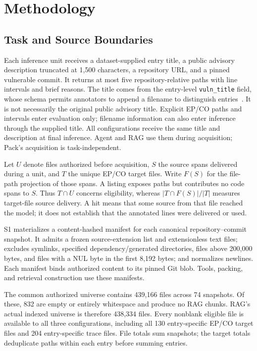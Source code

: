\section{Methodology}
\label{sec:method}
\subsection{Task and Source Boundaries}
Each inference unit receives a dataset-supplied entry title, a public advisory description truncated at 1,500 characters, a repository URL, and a pinned vulnerable commit. It returns at most five repository-relative paths with line intervals and brief reasons. The title comes from the entry-level \texttt{vuln\_title} field, whose schema permits annotators to append a filename to distinguish entries~\cite{vulngymdata}. It is not necessarily the original public advisory title. Explicit EP/CO paths and intervals enter evaluation only; filename information can also enter inference through the supplied title. All configurations receive the same title and description at final inference. Agent and RAG use them during acquisition; Pack's acquisition is task-independent.

Let $U$ denote files authorized before acquisition, $S$ the source spans delivered during a unit, and $T$ the unique EP/CO target files. Write $F(S)$ for the file-path projection of those spans. A listing exposes paths but contributes no code spans to $S$. Thus $T\cap U$ concerns eligibility, whereas $|T\cap F(S)|/|T|$ measures target-file source delivery. A hit means that some source from that file reached the model; it does not establish that the annotated lines were delivered or used.

S1 materializes a content-hashed manifest for each canonical repository--commit snapshot. It admits a frozen source-extension list and extensionless text files; excludes symlinks, specified dependency/generated directories, files above 200,000 bytes, and files with a NUL byte in the first 8,192 bytes; and normalizes newlines. Each manifest binds authorized content to its pinned Git blob. Tools, packing, and retrieval construction use these manifests.

The common authorized universe contains 439,166 files across 74 snapshots. Of these, 832 are empty or entirely whitespace and produce no RAG chunks. RAG's actual indexed universe is therefore 438,334 files. Every nonblank eligible file is available to all three configurations, including all 130 entry-specific EP/CO target files and 204 entry-specific trace files. File totals sum snapshots; the target totals deduplicate paths within each entry before summing entries.

